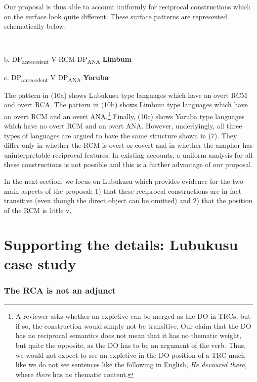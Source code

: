   Our proposal is thus able to account uniformly for reciprocal constructions which on the surface look quite different. These surface patterns are represented schematically below.

\begin{listWWviiiNumxlileveli}
\item \ea\label{ex:}
\\
\end{listWWviiiNumxlileveli}

  b.  DP\-\textsubscript{antecedent}      V-RCM  DP\textsubscript{ANA    }\textbf{Limbum}

  c.  DP\-\textsubscript{antecedent}      V    DP\textsubscript{ANA}    \textbf{Yoruba}  

The pattern in (10a) shows Lubukusu type languages which have an overt RCM and overt RCA. The pattern in (10b) shows Limbum type languages which have an overt RCM and an overt ANA.\footnote{ A reviewer asks whether an expletive can be merged as the DO in TRCs, but if so, the construction would simply not be transitive. Our claim that the DO has no reciprocal semantics does not mean that it has no thematic weight, but quite the opposite, as the DO has to be an argument of the verb. Thus, we would not expect to see an expletive in the DO position of a TRC much like we do not see sentences like the following in English, \textit{He devoured there}, where \textit{there }has\textit{ }no thematic content.  } Finally, (10c) shows Yoruba type languages which have no overt RCM and an overt ANA. However, underlyingly, all three types of languages are argued to have the same structure shown in (7). They differ only in whether the RCM is overt or covert and in whether the anaphor has uninterpretable reciprocal features.  In existing accounts, a uniform analysis for all these constructions is not possible and this is a further advantage of our proposal. 

  In the next section, we focus on Lubukusu which provides evidence for the two main aspects of the proposal: 1) that these reciprocal constructions are in fact transitive (even though the direct object can be omitted) and 2) that the position of the RCM is little v.

\chapter{Supporting the details: Lubukusu case study}
\subsection{ The RCA is not an adjunct}

